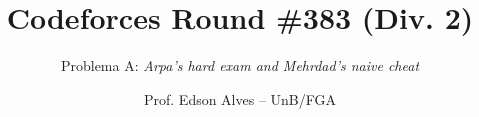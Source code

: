 \title{Codeforces Round \#383 (Div. 2)}
\subtitle{Problema A: \textit{Arpa's hard exam and Mehrdad's naive cheat}}
\author{Prof. Edson Alves -- UnB/FGA}
\date{}
